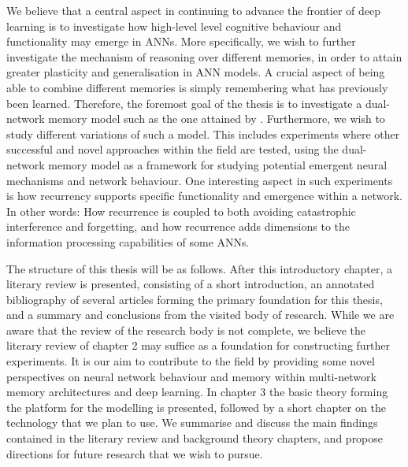 We believe that a central aspect in continuing to advance the frontier of deep learning is to investigate how high-level level cognitive behaviour and functionality may emerge in ANNs. More specifically, we wish to further investigate the mechanism of reasoning over different memories, in order to attain greater plasticity and generalisation in ANN models. A crucial aspect of being able to combine different memories is simply remembering what has previously been learned. Therefore, the foremost goal of the thesis is to investigate a dual-network memory model such as the one attained by \cite{Hattori2014}. Furthermore, we wish to study different variations of such a model. This includes experiments where other successful and novel approaches within the field are tested, using the dual-network memory model as a framework for studying potential emergent neural mechanisms and network behaviour.
One interesting aspect in such experiments is how recurrency supports specific functionality and emergence within a network. In other words: How recurrence is coupled to both avoiding catastrophic interference and forgetting, and how recurrence adds dimensions to the information processing capabilities of some ANNs.

The structure of this thesis will be as follows. After this introductory chapter, a literary review is presented, consisting of a short introduction, an annotated bibliography of several articles forming the primary foundation for this thesis, and a summary and conclusions from the visited body of research. While we are aware that the review of the research body is not complete, we believe the literary review of chapter 2 may suffice as a foundation for constructing further experiments. It is our aim to contribute to the field by providing some novel perspectives on neural network behaviour and memory within multi-network memory architectures and deep learning. In chapter 3 the basic theory forming the platform for the modelling is presented, followed by a short chapter on the technology that we plan to use. We summarise and discuss the main findings contained in the literary review and background theory chapters, and propose directions for future research that we wish to pursue.


\cleardoublepage